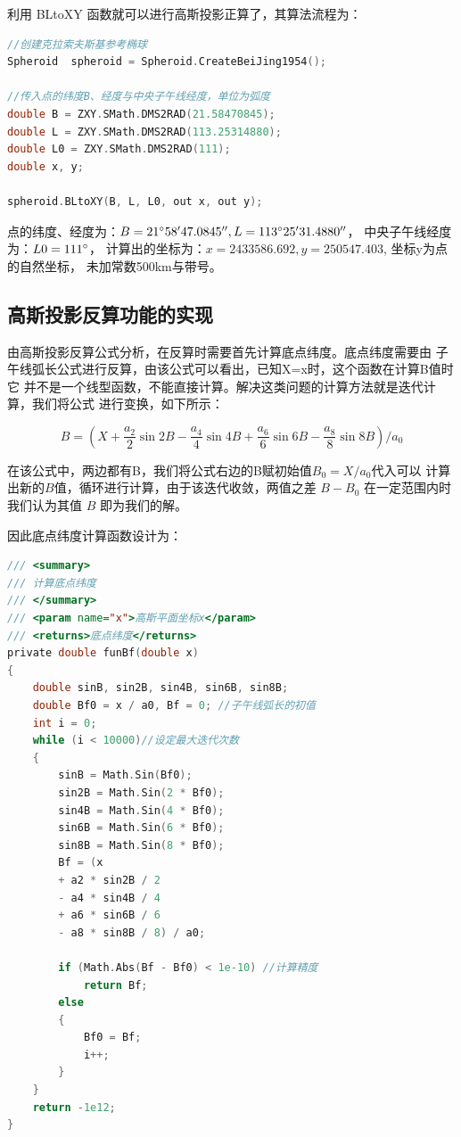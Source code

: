 利用 BLtoXY 函数就可以进行高斯投影正算了，其算法流程为：

\begin{lstlisting}[language=C]
//创建克拉索夫斯基参考椭球
Spheroid  spheroid = Spheroid.CreateBeiJing1954();

//传入点的纬度B、经度与中央子午线经度，单位为弧度
double B = ZXY.SMath.DMS2RAD(21.58470845);
double L = ZXY.SMath.DMS2RAD(113.25314880);
double L0 = ZXY.SMath.DMS2RAD(111);
double x, y;

spheroid.BLtoXY(B, L, L0, out x, out y);
\end{lstlisting}

点的纬度、经度为：$ B = 21 ^\circ 58'47.0845'',  L= 113^\circ 25'31.4880''$，
中央子午线经度为：$L0 = 111^\circ$，
计算出的坐标为：$x=2433586.692, y=250547.403$, 坐标y为点的自然坐标，
未加常数500km与带号。

\subsection{高斯投影反算功能的实现}
由高斯投影反算公式分析，在反算时需要首先计算底点纬度。底点纬度需要由
子午线弧长公式进行反算，由该公式可以看出，已知X=x时，这个函数在计算B值时它
并不是一个线型函数，不能直接计算。解决这类问题的计算方法就是迭代计算，我们将公式
进行变换，如下所示：

$$B= (X + \frac{a_2}{2}\sin 2B - \frac{a_4}{4}\sin 4B
+ \frac{a_6}{6} \sin 6B  - \frac{a_8}{8}\sin 8B)/a_0$$

在该公式中，两边都有B，我们将公式右边的B赋初始值$B_0=X/a_0$代入可以
计算出新的$B$值，循环进行计算，由于该迭代收敛，两值之差 $B - B_0$ 在一定范围内时
我们认为其值 $B$ 即为我们的解。

因此底点纬度计算函数设计为：

\begin{lstlisting}[language=C]
/// <summary>
/// 计算底点纬度
/// </summary>
/// <param name="x">高斯平面坐标x</param>
/// <returns>底点纬度</returns>
private double funBf(double x)
{
    double sinB, sin2B, sin4B, sin6B, sin8B;
    double Bf0 = x / a0, Bf = 0; //子午线弧长的初值
    int i = 0;
    while (i < 10000)//设定最大迭代次数
    {
        sinB = Math.Sin(Bf0);
        sin2B = Math.Sin(2 * Bf0);
        sin4B = Math.Sin(4 * Bf0);
        sin6B = Math.Sin(6 * Bf0);
        sin8B = Math.Sin(8 * Bf0);
        Bf = (x
        + a2 * sin2B / 2
        - a4 * sin4B / 4
        + a6 * sin6B / 6
        - a8 * sin8B / 8) / a0;

        if (Math.Abs(Bf - Bf0) < 1e-10) //计算精度
            return Bf;
        else
        {
            Bf0 = Bf;
            i++;
        }
    }
    return -1e12;
}
\end{lstlisting}

